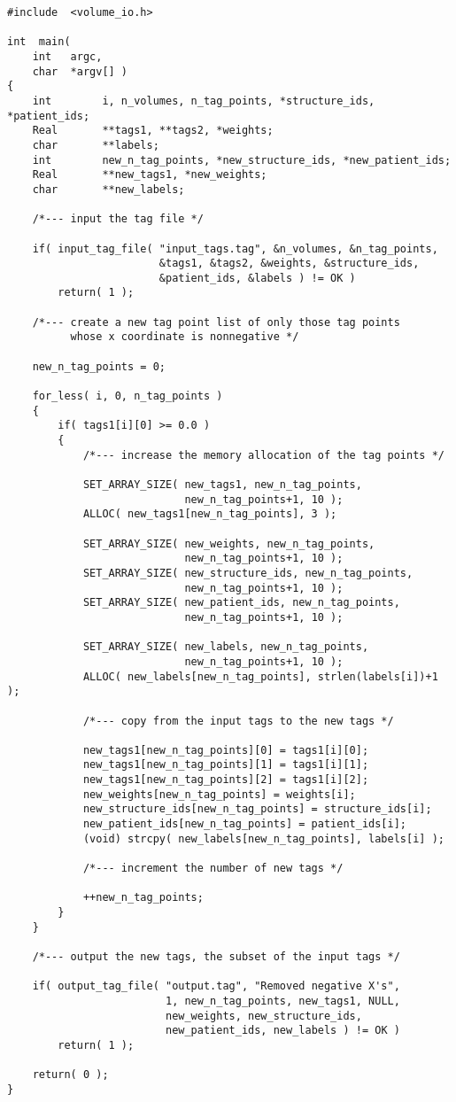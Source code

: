 {\small
\begin{verbatim}
#include  <volume_io.h>

int  main(
    int   argc,
    char  *argv[] )
{
    int        i, n_volumes, n_tag_points, *structure_ids, *patient_ids;
    Real       **tags1, **tags2, *weights;
    char       **labels;
    int        new_n_tag_points, *new_structure_ids, *new_patient_ids;
    Real       **new_tags1, *new_weights;
    char       **new_labels;

    /*--- input the tag file */

    if( input_tag_file( "input_tags.tag", &n_volumes, &n_tag_points,
                        &tags1, &tags2, &weights, &structure_ids,
                        &patient_ids, &labels ) != OK )
        return( 1 );

    /*--- create a new tag point list of only those tag points
          whose x coordinate is nonnegative */

    new_n_tag_points = 0;

    for_less( i, 0, n_tag_points )
    {
        if( tags1[i][0] >= 0.0 )
        {
            /*--- increase the memory allocation of the tag points */

            SET_ARRAY_SIZE( new_tags1, new_n_tag_points,
                            new_n_tag_points+1, 10 );
            ALLOC( new_tags1[new_n_tag_points], 3 );

            SET_ARRAY_SIZE( new_weights, new_n_tag_points,
                            new_n_tag_points+1, 10 );
            SET_ARRAY_SIZE( new_structure_ids, new_n_tag_points,
                            new_n_tag_points+1, 10 );
            SET_ARRAY_SIZE( new_patient_ids, new_n_tag_points,
                            new_n_tag_points+1, 10 );

            SET_ARRAY_SIZE( new_labels, new_n_tag_points,
                            new_n_tag_points+1, 10 );
            ALLOC( new_labels[new_n_tag_points], strlen(labels[i])+1 );

            /*--- copy from the input tags to the new tags */

            new_tags1[new_n_tag_points][0] = tags1[i][0];
            new_tags1[new_n_tag_points][1] = tags1[i][1];
            new_tags1[new_n_tag_points][2] = tags1[i][2];
            new_weights[new_n_tag_points] = weights[i];
            new_structure_ids[new_n_tag_points] = structure_ids[i];
            new_patient_ids[new_n_tag_points] = patient_ids[i];
            (void) strcpy( new_labels[new_n_tag_points], labels[i] );

            /*--- increment the number of new tags */

            ++new_n_tag_points;
        }
    }

    /*--- output the new tags, the subset of the input tags */

    if( output_tag_file( "output.tag", "Removed negative X's",
                         1, new_n_tag_points, new_tags1, NULL,
                         new_weights, new_structure_ids,
                         new_patient_ids, new_labels ) != OK )
        return( 1 );

    return( 0 );
}
\end{verbatim}
}

